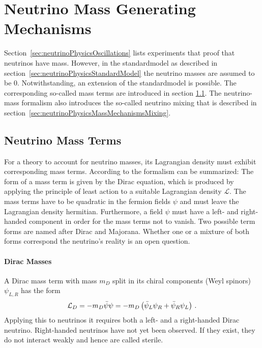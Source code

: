 \section{Neutrino Mass Generating Mechanisms}
\label{sec:neutrinoPhysicsMassMechanisms}
Section~\ref{sec:neutrinoPhysicsOscillations} lists experiments that proof that neutrinos have mass. However, in the \gls{standardmodel} as described in section~\ref{sec:neutrinoPhysicsStandardModel} the neutrino masses are assumed to be 0. Notwithstanding, an extension of the \gls{standardmodel} is possible. The corresponding so-called mass terms are introduced in section \ref{sec:neutrinoPhysicsMassMechanismsTerms}. The neutrino-mass formalism also introduces the so-called neutrino mixing that is described in section~\ref{sec:neutrinoPhysicsMassMechanismsMixing}.

\subsection{Neutrino Mass Terms}
\label{sec:neutrinoPhysicsMassMechanismsTerms}
For a theory to account for neutrino masses, its Lagrangian density must exhibit corresponding mass terms. According to \cite{zuber2011neutrino} the formalism can be summarized: The form of a mass term is given by the Dirac equation, which is produced by applying the principle of least action to a suitable Lagrangian density $\mathcal{L}$. The mass terms have to be quadratic in the fermion fields $\psi$ and must leave the Lagrangian density hermitian. Furthermore, a field $\psi$ must have a left- and right-handed component in order for the mass terms not to vanish. Two possible term forms are named after Dirac and Majorana. Whether one or a mixture of both forms correspond the neutrino's reality is an open question.

\paragraph{Dirac Masses}
A Dirac mass term with mass $m_D$ split in its chiral components (Weyl spinors) $\psi_{L,R}$ has the form~\cite{zuber2011neutrino}
\begin{equation}
\mathcal{L}_D =  -m_D \bar\psi\psi = -m_D \left(\bar\psi_L\psi_R + \bar\psi_R\psi_L \right) \text{\,.}
\end{equation}
Applying this to neutrinos it requires both a left- and a right-handed Dirac neutrino. Right-handed neutrinos have not yet been observed. If they exist, they do not interact weakly and hence are called sterile.

